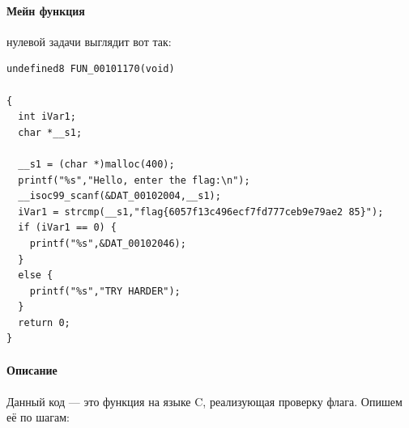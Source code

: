 \paragraph{Мейн функция} нулевой задачи выглядит вот так:

\begin{verbatim}
undefined8 FUN_00101170(void)

{
  int iVar1;
  char *__s1;

  __s1 = (char *)malloc(400);
  printf("%s","Hello, enter the flag:\n");
  __isoc99_scanf(&DAT_00102004,__s1);
  iVar1 = strcmp(__s1,"flag{6057f13c496ecf7fd777ceb9e79ae2 85}");
  if (iVar1 == 0) {
    printf("%s",&DAT_00102046);
  }
  else {
    printf("%s","TRY HARDER");
  }
  return 0;
}

\end{verbatim}

\paragraph{Описание}

\paragraph{}
Данный код --- это функция на языке C, реализующая проверку флага.
Опишем её по шагам:


